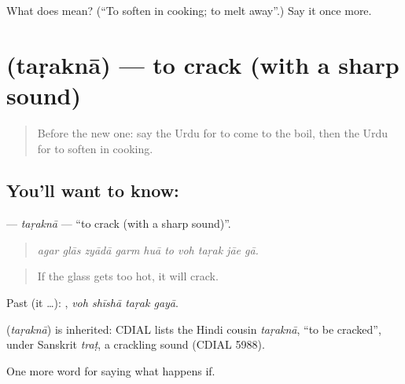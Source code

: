 \begin{tcolorbox}[breakable,colback=teal!4,colframe=teal!35!black,title={Before you move on}]
What does  mean? (\textquotedblleft{}To soften in cooking; to melt away\textquotedblright{}.) Say it once more.
\end{tcolorbox}
\section[\texorpdfstring{\ur{تڑکنا} (taṛaknā)}{تڑکنا (taṛaknā)}]{ (taṛaknā) — to crack (with a sharp sound)}

\label{lesson:UR-C372-tarakna}



\begin{quote}
Before the new one: say the Urdu for to come to the boil, then the Urdu for to soften in cooking.
\end{quote}

\subsection*{You'll want to know: }
\textbf{} — \emph{taṛaknā} — \textquotedblleft{}to crack (with a sharp sound)\textquotedblright{}.

\begin{quote}
         
\end{quote}

\begin{quote}
\emph{agar glās zyādā garm huā to voh taṛak jāe gā.}
\end{quote}

\begin{quote}
If the glass gets too hot, it will crack.
\end{quote}

Past (it …):    , \emph{voh shīshā taṛak gayā}.

\begin{cousinweb}
\textbf{} (\emph{taṛaknā}) is inherited: CDIAL lists the Hindi cousin \emph{taṛaknā}, \textquotedblleft{}to be cracked\textquotedblright{}, under Sanskrit \emph{traṭ}, a crackling sound (CDIAL 5988).
\end{cousinweb}

\begin{grammarlens}[title={What you've built}]
One more word for saying what happens if.
\end{grammarlens}

